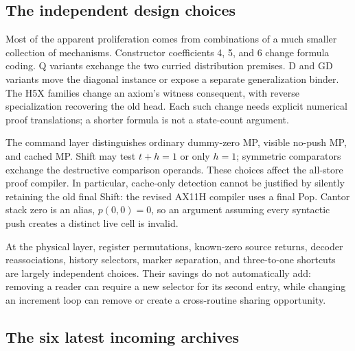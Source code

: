 \documentclass[11pt]{article}
\begin{document}
\subsection{The independent design choices}

Most of the apparent proliferation comes from combinations of a much
smaller collection of mechanisms. Constructor coefficients 4, 5, and 6
change formula coding. Q variants exchange the two curried distribution
premises. D and GD variants move the diagonal instance or expose a
separate generalization binder. The H5X families change an axiom's
witness consequent, with reverse specialization recovering the old
head. Each such change needs explicit numerical proof translations;
a shorter formula is not a state-count argument.

The command layer distinguishes ordinary dummy-zero MP, visible
no-push MP, and cached MP. Shift may test $t+h=1$ or only $h=1$;
symmetric comparators exchange the destructive comparison operands.
These choices affect the all-store proof compiler. In particular,
cache-only detection cannot be justified by silently retaining the old
final Shift: the revised AX11H compiler uses a final Pop. Cantor stack
zero is an alias, $p(0,0)=0$, so an argument assuming every syntactic
push creates a distinct live cell is invalid.

At the physical layer, register permutations, known-zero source
returns, decoder reassociations, history selectors, marker separation,
and three-to-one shortcuts are largely independent choices. Their
savings do not automatically add: removing a reader can require a new
selector for its second entry, while changing an increment loop can
remove or create a cross-routine sharing opportunity.

\subsection{The six latest incoming archives}
\end{document}
